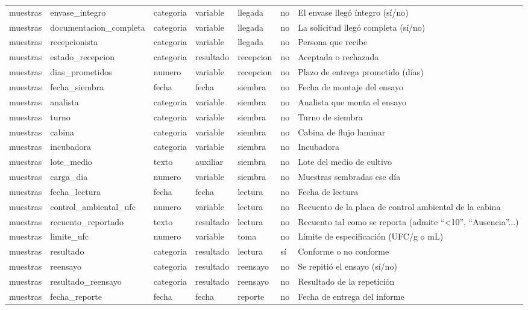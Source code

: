 \begin{tabular}{lllllll}
muestras & envase\_integro & categoria & variable & llegada & no & El envase llegó íntegro (sí/no) \\
muestras & documentacion\_completa & categoria & variable & llegada & no & La solicitud llegó completa (sí/no) \\
muestras & recepcionista & categoria & variable & llegada & no & Persona que recibe \\
muestras & estado\_recepcion & categoria & resultado & recepcion & no & Aceptada o rechazada \\
muestras & dias\_prometidos & numero & variable & recepcion & no & Plazo de entrega prometido (días) \\
muestras & fecha\_siembra & fecha & fecha & siembra & no & Fecha de montaje del ensayo \\
muestras & analista & categoria & variable & siembra & no & Analista que monta el ensayo \\
muestras & turno & categoria & variable & siembra & no & Turno de siembra \\
muestras & cabina & categoria & variable & siembra & no & Cabina de flujo laminar \\
muestras & incubadora & categoria & variable & siembra & no & Incubadora \\
muestras & lote\_medio & texto & auxiliar & siembra & no & Lote del medio de cultivo \\
muestras & carga\_dia & numero & variable & siembra & no & Muestras sembradas ese día \\
muestras & fecha\_lectura & fecha & fecha & lectura & no & Fecha de lectura \\
muestras & control\_ambiental\_ufc & numero & variable & lectura & no & Recuento de la placa de control ambiental de la cabina \\
muestras & recuento\_reportado & texto & resultado & lectura & no & Recuento tal como se reporta (admite ``<10'', ``Ausencia''...) \\
muestras & limite\_ufc & numero & variable & toma & no & Límite de especificación (UFC/g o mL) \\
muestras & resultado & categoria & resultado & lectura & sí & Conforme o no conforme \\
muestras & reensayo & categoria & resultado & reensayo & no & Se repitió el ensayo (sí/no) \\
muestras & resultado\_reensayo & categoria & resultado & reensayo & no & Resultado de la repetición \\
muestras & fecha\_reporte & fecha & fecha & reporte & no & Fecha de entrega del informe \\

\end{tabular}
